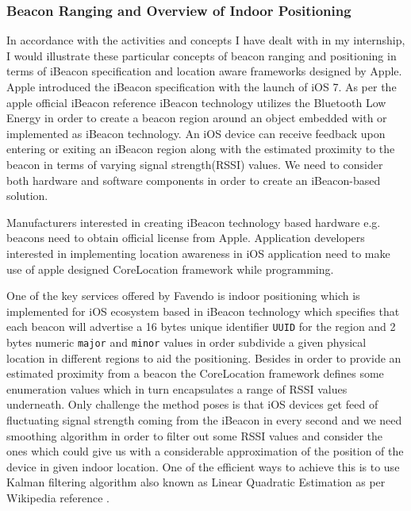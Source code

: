 \subsubsection{Beacon Ranging and Overview of Indoor Positioning}
In accordance with the activities and concepts I have dealt with in my internship, I would illustrate these particular concepts of beacon ranging and positioning in terms of iBeacon specification and location aware frameworks designed by Apple. Apple introduced the iBeacon specification  with the launch of iOS 7. As per the apple official iBeacon reference \cite{appleibeacon} iBeacon technology utilizes the Bluetooth Low Energy in order to create a beacon region around an object embedded with or implemented as iBeacon technology. An iOS device can receive feedback upon entering or exiting an iBeacon region along with the estimated proximity to the beacon in terms of varying signal strength(RSSI)  values. We need to consider both hardware and software components in order to create an iBeacon-based solution.
\par Manufacturers interested in creating iBeacon technology based hardware e.g. beacons need to obtain official license from Apple. Application developers interested in implementing location awareness in iOS application need to make use of apple designed CoreLocation \cite{applecorelocation} framework while programming.
\par One of the key services offered by Favendo is indoor positioning which is implemented for iOS ecosystem based in iBeacon technology which specifies that each beacon will advertise a 16 bytes unique identifier \texttt{UUID} for the region and 2 bytes numeric \texttt{major} and \texttt{minor}  values in order subdivide a given physical location in different regions to aid the positioning. Besides in order to provide an estimated proximity from a beacon the CoreLocation framework defines some enumeration values which in turn encapsulates a range of RSSI values underneath. Only challenge the method poses is that iOS devices get feed of fluctuating signal strength coming from the iBeacon in every second and we need smoothing algorithm in order to filter out some RSSI values and consider the ones which could give us with a considerable approximation of the position of the device in given indoor location. One of the efficient ways to achieve this is to use Kalman filtering algorithm also known as Linear Quadratic Estimation as per Wikipedia reference \cite{wikikalmanfilter}. 
